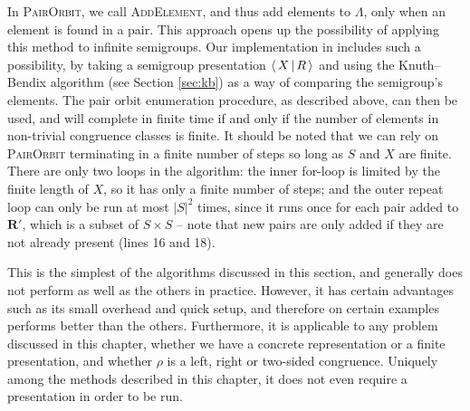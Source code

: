 In \textsc{PairOrbit}, we call \textsc{AddElement}, and thus add
elements to $\Lambda$, only when an element is found in a pair.
This approach opens up the possibility of applying this method to infinite
semigroups.  Our implementation in \libsemigroups{} \cite{libsemigroups}
includes such a possibility, by taking a semigroup presentation $\left\langle \, X \, \middle| \, R \, \right\rangle$ and
using the Knuth--Bendix algorithm (see Section \ref{sec:kb}) as a way of comparing the semigroup's
elements.  The pair orbit enumeration procedure, as described above, can then be
used, and will complete in finite time if and only if the number of elements in
non-trivial congruence classes is finite.  It should be noted that we can rely
on \textsc{PairOrbit} terminating in a finite number of steps so long as $S$ and
$X$ are finite.  There are only two loops in the algorithm: the inner for-loop
is limited by the finite length of $X$, so it has only a finite number of steps;
and the outer repeat loop can only be run at most $|S|^2$ times, since it runs
once for each pair added to $\mathbf{R}'$, which is a subset of $S \times S$ --
note that new pairs are only added if they are not already present (lines 16 and
18).

This is the simplest of the algorithms discussed in this section, and generally
does not perform as well as the others in practice.  However, it has certain
advantages such as its small overhead and quick setup, and therefore on certain
examples performs better than the others.  Furthermore, it is applicable to any
problem discussed in this chapter, whether we have a concrete representation or
a finite presentation, and whether $\rho$ is a left, right or two-sided
congruence.  Uniquely among the methods described in this chapter, it does not
even require a presentation in order to be run.

